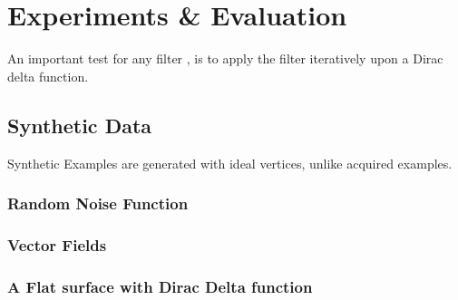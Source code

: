 \chapter{Experiments \& Evaluation}
An important test for any filter\todoCitation{} , is to apply the filter iteratively upon a Dirac delta function\todoCitation{}.
\section{Synthetic Data}
Synthetic Examples are generated with ideal vertices, unlike acquired examples.

\subsection{Random Noise Function}

\subsection{Vector Fields}

\subsection{A Flat surface with Dirac Delta function}
